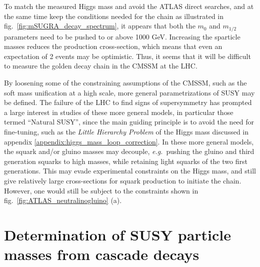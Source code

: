 \documentclass[twoside,english]{uiofysmaster}
\begin{document}
To match the measured Higgs mass and avoid the ATLAS direct searches, and at the same time keep the conditions needed for the chain as illustrated in fig.\ \ref{fig:mSUGRA_decay_spectrum}, it appears that both the $m_0$ and $m_{1/2}$ parameters need to be pushed to or above 1000 GeV. Increasing the sparticle masses reduces the production cross-section, which means that even an expectation of 2 events may be optimistic. Thus, it seems that it will be difficult to measure the golden decay chain in the CMSSM at the LHC.

By loosening some of the constraining assumptions of the CMSSM, such as the soft mass unification at a high scale, more general parametrizations of SUSY may be defined. The failure of the LHC to find signs of supersymmetry has prompted a large interest in studies of these more general models, in particular those  termed ``Natural SUSY'', since the main guiding principle is to avoid the need for fine-tuning, such as the {\it Little Hierarchy Problem} of the Higgs mass discussed in appendix \ref{appendix:higgs_mass_loop_correction}. In these more general models, the squark and/or gluino masses may decouple, {\it e.g.}\ pushing the gluino and third generation squarks to high masses, while retaining light squarks of the two first generations. This may evade experimental constraints on the Higgs mass, and still give relatively large cross-sections for squark production to initiate the chain. However, one would still be subject to the constraints shown in fig.~\ref{fig:ATLAS_neutralinogluino} (a).



















\chapter{Determination of SUSY particle masses from cascade decays}%
\label{ch:introducing_the_method}
\end{document}
